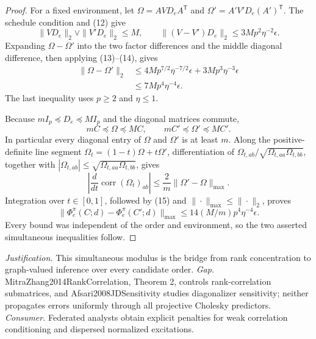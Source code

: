 \documentclass{article}
\begin{document}
\begin{proof}
For a fixed environment, let \(\Omega=AVD_eA^{\mathsf T}\) and
\(\Omega'=A'V'D_e(A')^{\mathsf T}\).  The schedule condition and (12) give
\[
 \|VD_e\|_2\vee\|V'D_e\|_2\le M,
 \qquad
 \|(V-V')D_e\|_2\le3Mp^2\eta^{-2}\epsilon.
\]
Expanding \(\Omega-\Omega'\) into the two factor differences and the middle diagonal difference, then applying (13)--(14), gives
\[
 \begin{aligned}
 \|\Omega-\Omega'\|_2
 &\le4Mp^{7/2}\eta^{-7/2}\epsilon
      +3Mp^3\eta^{-3}\epsilon\\
 &\le7Mp^4\eta^{-4}\epsilon. 
 \end{aligned} \tag{15}
\]
The last inequality uses \(p\ge2\) and \(\eta\le1\).

Because \(mI_p\preceq D_e\preceq MI_p\) and the diagonal matrices commute,
\[
 mC\preceq\Omega\preceq MC,
 \qquad mC'\preceq\Omega'\preceq MC'.
\]
In particular every diagonal entry of \(\Omega\) and \(\Omega'\) is at least \(m\).  Along the positive-definite line segment \(\Omega_t=(1-t)\Omega+t\Omega'\), differentiation of
\(\Omega_{t,ab}/\sqrt{\Omega_{t,aa}\Omega_{t,bb}}\), together with
\(|\Omega_{t,ab}|\le\sqrt{\Omega_{t,aa}\Omega_{t,bb}}\), gives
\[
 \left|\frac{d}{dt}\operatorname{corr}(\Omega_t)_{ab}\right|
 \le \frac{2}{m}\|\Omega'-\Omega\|_{\max}.
\]
Integration over \(t\in[0,1]\), followed by (15) and
\(\|\cdot\|_{\max}\le\|\cdot\|_2\), proves
\[
 \|\Phi_e^\pi(C;d)-\Phi_e^\pi(C';d)\|_{\max}
 \le14(M/m)p^4\eta^{-4}\epsilon.
\]
Every bound was independent of the order and environment, so the two asserted simultaneous inequalities follow.
\end{proof}
\par\smallskip\noindent \textit{Justification.} This simultaneous modulus is the bridge from rank concentration to graph-valued inference over every candidate order. \textit{Gap.} MitraZhang2014RankCorrelation, Theorem 2, controls rank-correlation submatrices, and Afsari2008JDSensitivity studies diagonalizer sensitivity; neither propagates errors uniformly through all projective Cholesky predictors. \textit{Consumer.} Federated analysts obtain explicit penalties for weak correlation conditioning and dispersed normalized excitations.
\end{document}
